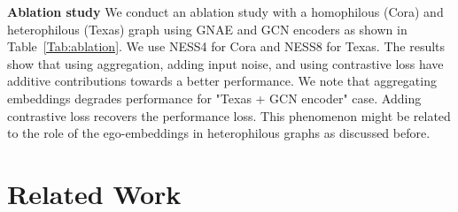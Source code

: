 \documentclass{article}
\begin{document}
\textbf{Ablation study} We conduct an ablation study with a homophilous (Cora) and heterophilous (Texas) graph using GNAE and GCN encoders as shown in Table~\ref{Tab:ablation}. We use NESS4 for Cora and NESS8 for Texas. The results show that using aggregation, adding input noise, and using contrastive loss have additive contributions towards a better performance. We note that aggregating embeddings degrades performance for "Texas + GCN encoder" case. Adding contrastive loss recovers the performance loss. This phenomenon might be related to the role of the ego-embeddings in heterophilous graphs as discussed before.

\section{Related Work}
\end{document}
